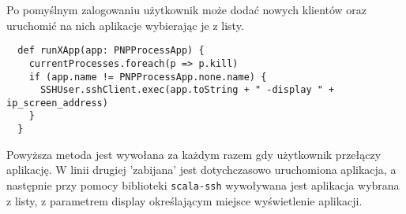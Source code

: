 \par

Po pomyślnym zalogowaniu użytkownik może dodać nowych klientów oraz uruchomić na nich aplikacje wybierając je z listy.

\begin{lstlisting}
  def runXApp(app: PNPProcessApp) {
    currentProcesses.foreach(p => p.kill)
    if (app.name != PNPProcessApp.none.name) {
      SSHUser.sshClient.exec(app.toString + " -display " + ip_screen_address)
    }
  }
\end{lstlisting}

Powyższa metoda jest wywołana za każdym razem gdy użytkownik przełączy aplikację. W linii drugiej 'zabijana' jest dotychczasowo uruchomiona aplikacja, a następnie przy pomocy biblioteki \lstinline{scala-ssh} wywoływana jest aplikacja wybrana z listy, z parametrem display określającym miejsce wyświetlenie aplikacji.



